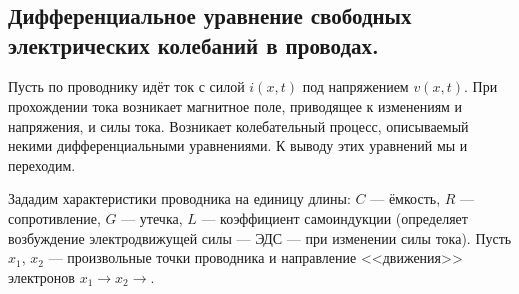 	\chapter{}
\label{lecture14}
\section[Телеграфные уравнения.]{Дифференциальное уравнение свободных электрических колебаний в проводах.}
\label{lecture14section1}
Пусть по проводнику идёт ток с силой $i(x,t)$ под напряжением $v(x,t)$. При прохождении тока возникает магнитное поле, приводящее к изменениям и напряжения, и силы тока. Возникает колебательный процесс, описываемый некими дифференциальными уравнениями. К выводу этих уравнений мы и переходим. 

Зададим характеристики проводника на единицу длины: $C$ --- ёмкость, $R$ --- сопротивление, $G$ --- утечка, $L$ --- коэффициент самоиндукции (определяет возбуждение электродвижущей силы --- ЭДС --- при изменении силы тока). Пусть $x_1$, $x_2$ --- произвольные точки проводника и направление <<движения>> электронов $x_1\to x_2\to$. 
\vspace{0.2cm}



\vspace{0.2cm}

